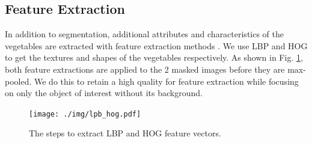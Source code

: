 \subsection{Feature Extraction}
In addition to segmentation, additional attributes and characteristics of the vegetables are extracted with feature extraction methods \cite{b4_4}. We use LBP and HOG to get the textures and shapes of the vegetables respectively. As shown in Fig. \ref{fig:lbp_hog}, both feature extractions are applied to the 2 masked images before they are max-pooled. We do this to retain a high quality for feature extraction while focusing on only the object of interest without its background.

\begin{figure}[tp]
	\centerline{\texttt{[image: ./img/lpb\_hog.pdf]}}
	\caption{The steps to extract LBP and HOG feature vectors.}
	\label{fig:lbp_hog}
\end{figure}